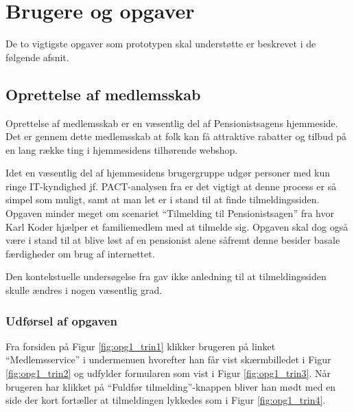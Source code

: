 \section{Brugere og opgaver}

De to vigtigste opgaver som prototypen skal understøtte er beskrevet i de
følgende afsnit.

\subsection{Oprettelse af medlemsskab}

Oprettelse af medlemsskab er en væsentlig del af Pensionistsagens hjemmeside.
Det er gennem dette medlemsskab at folk kan få attraktive rabatter og tilbud
på en lang række ting i hjemmesidens tilhørende webshop.

Idet en væsentlig del af hjemmesidens brugergruppe udgør personer med kun
ringe IT-kyndighed jf. PACT-analysen fra \cite{opgave2} er det vigtigt at
denne process er så simpel som muligt, samt at man let er i stand til at
finde tilmeldingssiden. Opgaven minder meget om scenariet ``Tilmelding til
Pensionistsagen'' fra \cite{opgave2} hvor Karl Koder hjælper et familiemedlem
med at tilmelde sig. Opgaven skal dog også være i stand til at blive løst
af en pensionist alene såfremt denne besider basale færdigheder om brug af
internettet.

Den kontekstuelle undersøgelse fra \cite{opgave3} gav ikke anledning til at
tilmeldingssiden skulle ændres i nogen væsentlig grad.

\subsubsection{Udførsel af opgaven}

Fra forsiden på Figur \ref{fig:opg1_trin1} klikker brugeren på
linket ``Medlemsservice'' i undermenuen hvorefter han får vist
skærmbilledet i Figur \ref{fig:opg1_trin2} og udfylder formularen som vist
i Figur \ref{fig:opg1_trin3}. Når brugeren har klikket på ``Fuldfør
tilmelding''-knappen bliver han mødt med en side der kort fortæller at
tilmeldingen lykkedes som i Figur \ref{fig:opg1_trin4}.


